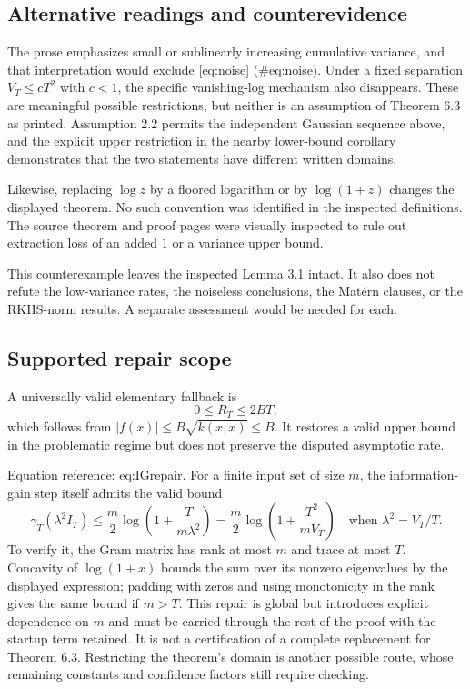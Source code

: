 \documentclass[10pt]{article}
\begin{document}
\subsection*{Alternative readings and counterevidence}
The prose emphasizes small or sublinearly increasing cumulative variance, and that interpretation would exclude [eq:noise] (\#eq:noise). Under a fixed separation \(V_T\le cT^2\) with \(c<1\), the specific vanishing-log mechanism also disappears. These are meaningful possible restrictions, but neither is an assumption of Theorem 6.3 as printed. Assumption 2.2 permits the independent Gaussian sequence above, and the explicit upper restriction in the nearby lower-bound corollary demonstrates that the two statements have different written domains.\par
Likewise, replacing \(\log z\) by a floored logarithm or by \(\log(1+z)\) changes the displayed theorem. No such convention was identified in the inspected definitions. The source theorem and proof pages were visually inspected to rule out extraction loss of an added \(1\) or a variance upper bound.\par
This counterexample leaves the inspected Lemma 3.1 intact. It also does not refute the low-variance rates, the noiseless conclusions, the Matérn clauses, or the RKHS-norm results. A separate assessment would be needed for each.\par
\subsection*{Supported repair scope}
A universally valid elementary fallback is \[0\le R_T\le2BT,\] which follows from \(|f(x)|\le B\sqrt{k(x,x)}\le B\). It restores a valid upper bound in the problematic regime but does not preserve the disputed asymptotic rate.\par
Equation reference: eq:IGrepair. For a finite input set of size \(m\), the information-gain step itself admits the valid bound \[
 \gamma_T(\lambda^2I_T)
 \le\frac m2\log\!\left(1+\frac{T}{m\lambda^2}\right)
 =\frac m2\log\!\left(1+\frac{T^2}{mV_T}\right)
 \quad\text{when }\lambda^2=V_T/T.\] To verify it, the Gram matrix has rank at most \(m\) and trace at most \(T\). Concavity of \(\log(1+x)\) bounds the sum over its nonzero eigenvalues by the displayed expression; padding with zeros and using monotonicity in the rank gives the same bound if \(m>T\). This repair is global but introduces explicit dependence on \(m\) and must be carried through the rest of the proof with the startup term retained. It is not a certification of a complete replacement for Theorem 6.3. Restricting the theorem’s domain is another possible route, whose remaining constants and confidence factors still require checking.\par
\end{document}
